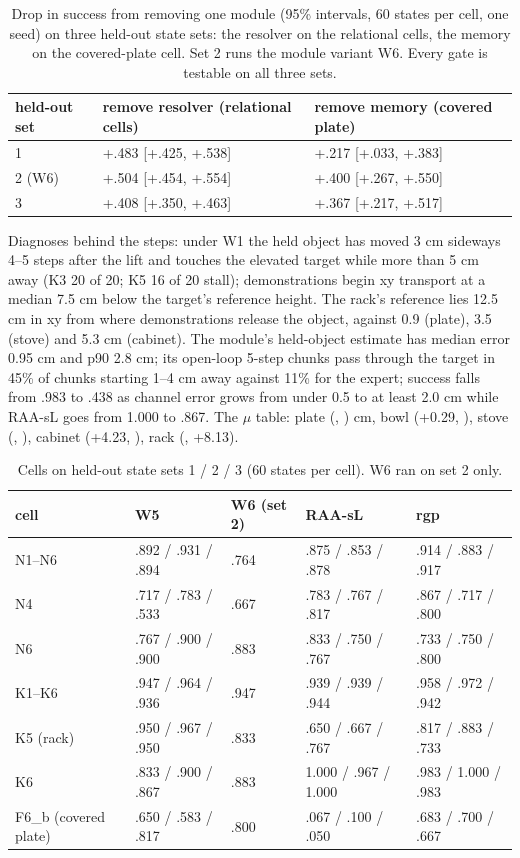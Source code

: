 \begin{table}[h]
\caption{Drop in success from removing one module (95\% intervals, 60 states per cell, one seed) on three held-out state sets: the resolver on the relational cells, the memory on the covered-plate cell. Set 2 runs the module variant W6. Every gate is testable on all three sets.}
\label{tab:removal}
\centering
\footnotesize
\begin{tabular}{@{}lll@{}}
\toprule
held-out set & remove resolver (relational cells) & remove memory (covered plate) \\
\midrule
1 & +.483 [+.425, +.538] & +.217 [+.033, +.383] \\
2 (W6) & +.504 [+.454, +.554] & +.400 [+.267, +.550] \\
3 & +.408 [+.350, +.463] & +.367 [+.217, +.517] \\
\bottomrule
\end{tabular}
\end{table}

Diagnoses behind the steps: under W1 the held object has moved 3 cm sideways 4--5 steps after the lift and touches the elevated target while more than 5 cm away (K3 20 of 20; K5 16 of 20 stall); demonstrations begin xy transport at a median 7.5 cm below the target's reference height. The rack's reference lies 12.5 cm in xy from where demonstrations release the object, against 0.9 (plate), 3.5 (stove) and 5.3 cm (cabinet). The module's held-object estimate has median error 0.95 cm and p90 2.8 cm; its open-loop 5-step chunks pass through the target in 45\% of chunks starting 1--4 cm away against 11\% for the expert; success falls from .983 to .438 as channel error grows from under 0.5 to at least 2.0 cm while RAA-sL goes from 1.000 to .867. The $\mu$ table: plate (, ) cm, bowl (+0.29, ), stove (, ), cabinet (+4.23, ), rack (, +8.13).

\begin{table}[h]
\caption{Cells on held-out state sets 1 / 2 / 3 (60 states per cell). W6 ran on set 2 only.}
\label{tab:C2}
\centering
\footnotesize
\begin{tabular}{@{}lllll@{}}
\toprule
cell & W5 & W6 (set 2) & RAA-sL & rgp \\
\midrule
N1--N6 & .892 / .931 / .894 & .764 & .875 / .853 / .878 & .914 / .883 / .917 \\
N4 & .717 / .783 / .533 & .667 & .783 / .767 / .817 & .867 / .717 / .800 \\
N6 & .767 / .900 / .900 & .883 & .833 / .750 / .767 & .733 / .750 / .800 \\
K1--K6 & .947 / .964 / .936 & .947 & .939 / .939 / .944 & .958 / .972 / .942 \\
K5 (rack) & .950 / .967 / .950 & .833 & .650 / .667 / .767 & .817 / .883 / .733 \\
K6 & .833 / .900 / .867 & .883 & 1.000 / .967 / 1.000 & .983 / 1.000 / .983 \\
F6\_b (covered plate) & .650 / .583 / .817 & .800 & .067 / .100 / .050 & .683 / .700 / .667 \\
\bottomrule
\end{tabular}
\end{table}


